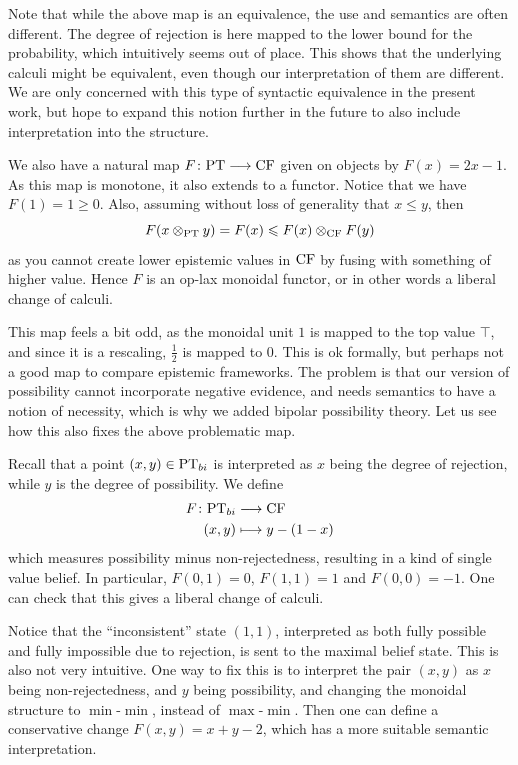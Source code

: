 \begin{remark}
    Note that while the above map is an equivalence, the use and semantics are often different. The degree of rejection is here mapped to the lower bound for the probability, which intuitively seems out of place. This shows that the underlying calculi might be equivalent, even though our interpretation of them are different. We are only concerned with this type of syntactic equivalence in the present work, but hope to expand this notion further in the future to also include interpretation into the structure. 
\end{remark}

We also have a natural map $F\colon \mathrm{PT} \longrightarrow \mathrm{CF}$ given on objects by $F(x) = 2x-1$. As this map is monotone, it also extends to a functor. Notice that we have $F(1) = 1 \geq 0$. Also, assuming without loss of generality that $x \leq y$, then 
\[F(x\otimes_{\mathrm{PT}} y) = F(x) \leqslant F(x)\otimes_{\mathrm{CF}} F(y)\]
as you cannot create lower epistemic values in $\mathrm{CF}$ by fusing with something of higher value. Hence $F$ is an op-lax monoidal functor, or in other words a liberal change of calculi. 

This map feels a bit odd, as the monoidal unit $1$ is mapped to the top value $\top$, and since it is a rescaling, $\frac{1}{2}$ is mapped to $0$. This is ok formally, but perhaps not a good map to compare epistemic frameworks. The problem is that our version of possibility cannot incorporate negative evidence, and needs semantics to have a notion of necessity, which is why we added bipolar possibility theory. Let us see how this also fixes the above problematic map. 

Recall that a point $(x,y) \in \mathrm{PT}_{bi}$ is interpreted as $x$ being the degree of rejection, while $y$ is the degree of possibility. We define 
\begin{align*}
    F \colon \mathrm{PT}_{bi} &\longrightarrow \mathrm{CF} \\ 
    (x,y) &\longmapsto y-(1-x)
\end{align*}
which measures possibility minus non-rejectedness, resulting in a kind of single value belief. In particular, $F(0,1)=0$, $F(1,1)=1$ and $F(0,0) = -1$. One can check that this gives a liberal change of calculi. 

\begin{remark}
    Notice that the ``inconsistent'' state $(1,1)$, interpreted as both fully possible and fully impossible due to rejection, is sent to the maximal belief state. This is also not very intuitive. One way to fix this is to interpret the pair $(x,y)$ as $x$ being non-rejectedness, and $y$ being possibility, and changing the monoidal structure to $\min$-$\min$, instead of $\max$-$\min$. Then one can define a conservative change $F(x,y)=x+y-2$, which has a more suitable semantic interpretation. 
\end{remark}




